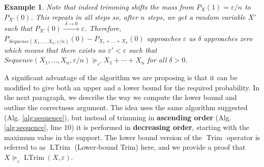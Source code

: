 \documentclass{article}
\newtheorem{example}{Example}
\DeclareMathOperator{\support}{support}
\DeclareMathOperator{\Trim}{Trim}
\DeclareMathOperator{\LTrim}{LTrim}
\begin{document}
\begin{example}
	Note that indeed trimming shifts the mass from $P_X(1)=\varepsilon/n$ to $P_{X'}(0)$.
	This repeats in all steps so, after $n$ steps, we get a random variable $X'$ such that $P_{X'}(0) \xrightarrow{\,\,\delta \to 0\,\,} \varepsilon$. Therefore, 
	$P_{Sequence(X_1,\dots,X_n,\varepsilon/n)}(0) {-} P_{X_1{+}\dots{+}X_n}(0)$
	approaches $\varepsilon$ as $\delta$ approaches zero
	which means that there exists no $\varepsilon' {<} \varepsilon$
	such that $Sequence(X_1,\dots,X_n,\varepsilon/n) \succeq_{\varepsilon'} X_1 + \cdots + X_n$ for all $\delta >0$.
	
\end{example}

A significant advantage of the algorithm we are proposing is that it can be modified to give both an upper and a lower bound for the required probability. In the next paragraph, we describe the way we compute the lower bound and outline the correctness argument. The idea uses the same algorithm suggested (Alg. \ref{alg:sequence}), but instead of trimming in \textbf{ascending order} (Alg. \ref{alg:sequence}, line 10) it is performed in \textbf{decreasing order}, starting with the maximum value in the support. The lower bound version of the $\Trim$ operator is referred to as $\LTrim$ (Lower-bound Trim) here, and we provide a proof that $X\succeq_{\varepsilon}\LTrim(X,\varepsilon) $. 
%		
%		
%		
%		
%	
\end{document}

